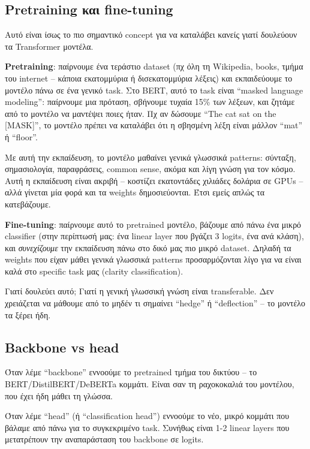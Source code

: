 \documentclass[12pt]{fphw}
\begin{document}
\subsection{Pretraining και fine-tuning}

Αυτό είναι ίσως το πιο σημαντικό concept για να καταλάβει κανείς γιατί δουλεύουν τα Transformer μοντέλα.

\textbf{Pretraining}: παίρνουμε ένα τεράστιο dataset (πχ όλη τη Wikipedia, books, τμήμα του internet -- κάποια εκατομμύρια ή δισεκατομμύρια λέξεις) και εκπαιδεύουμε το μοντέλο πάνω σε ένα γενικό task. Στο BERT, αυτό το task είναι ``masked language modeling'': παίρνουμε μια πρόταση, σβήνουμε τυχαία 15\% των λέξεων, και ζητάμε από το μοντέλο να μαντέψει ποιες ήταν. Πχ αν δώσουμε ``The cat sat on the [MASK]'', το μοντέλο πρέπει να καταλάβει ότι η σβησμένη λέξη είναι μάλλον ``mat'' ή ``floor''.

Με αυτή την εκπαίδευση, το μοντέλο μαθαίνει γενικά γλωσσικά patterns: σύνταξη, σημασιολογία, παραφράσεις, common sense, ακόμα και λίγη γνώση για τον κόσμο. Αυτή η εκπαίδευση είναι ακριβή -- κοστίζει εκατοντάδες χιλιάδες δολάρια σε GPUs -- αλλά γίνεται μία φορά και τα weights δημοσιεύονται. Έτσι εμείς απλώς τα κατεβάζουμε.

\textbf{Fine-tuning}: παίρνουμε αυτό το pretrained μοντέλο, βάζουμε από πάνω ένα μικρό classifier (στην περίπτωσή μας: ένα linear layer που βγάζει 3 logits, ένα ανά κλάση), και \emph{συνεχίζουμε} την εκπαίδευση πάνω στο δικό μας πιο μικρό dataset. Δηλαδή τα weights που είχαν μάθει γενικά γλωσσικά patterns προσαρμόζονται λίγο για να είναι καλά στο specific task μας (clarity classification).

Γιατί δουλεύει αυτό; Γιατί η γενική γλωσσική γνώση είναι transferable. Δεν χρειάζεται να μάθουμε από το μηδέν τι σημαίνει ``hedge'' ή ``deflection'' -- το μοντέλο τα ξέρει ήδη.

\subsection{Backbone vs head}

Όταν λέμε ``backbone'' εννοούμε το pretrained τμήμα του δικτύου -- το BERT/DistilBERT/DeBERTa κομμάτι. Είναι σαν τη ραχοκοκαλιά του μοντέλου, που έχει ήδη μάθει τη γλώσσα.

Όταν λέμε ``head'' (ή ``classification head'') εννοούμε το νέο, μικρό κομμάτι που βάλαμε από πάνω για το συγκεκριμένο task. Συνήθως είναι 1-2 linear layers που μετατρέπουν την αναπαράσταση του backbone σε logits.
\end{document}

